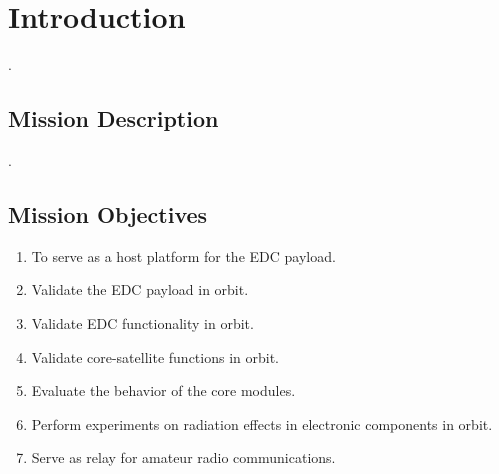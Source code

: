 %
%
%
%
%

%
%
%
%
%
%

\chapter{Introduction} \label{ch:introduction}

.

\section{Mission Description}

.

\section{Mission Objectives}

\begin{enumerate}
    \item To serve as a host platform for the EDC payload.
    \item Validate the EDC payload in orbit.
    \item Validate EDC functionality in orbit.
    \item Validate core-satellite functions in orbit.
    \item Evaluate the behavior of the core modules.
    \item Perform experiments on radiation effects in electronic components in orbit.
    \item Serve as relay for amateur radio communications.
\end{enumerate}
